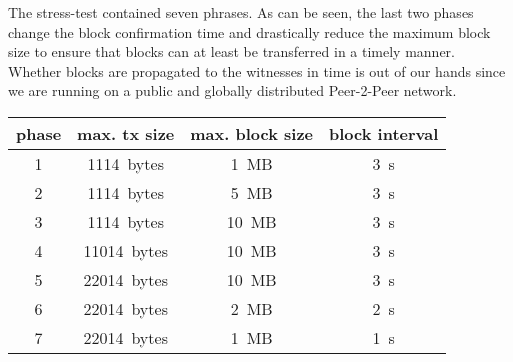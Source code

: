 The stress-test contained seven phrases. As can be seen, the last two phases
change the block confirmation time and drastically reduce the maximum block
size to ensure that blocks can at least be transferred in a timely manner.
Whether blocks are propagated to the witnesses in time is out of our hands
since we are running on a public and globally distributed Peer-2-Peer network.

\begin{tabular}{c|c|c|c}
 \textbf{phase} & \textbf{max. tx size} & \textbf{max. block size} & \textbf{block interval} \\\hline
 1 & \SI{1114}{bytes}  & \SI{1}{MB}  & \SI{3}{s} \\
 2 & \SI{1114}{bytes}  & \SI{5}{MB}  & \SI{3}{s} \\
 3 & \SI{1114}{bytes}  & \SI{10}{MB} & \SI{3}{s} \\
 4 & \SI{11014}{bytes} & \SI{10}{MB} & \SI{3}{s} \\
 5 & \SI{22014}{bytes} & \SI{10}{MB} & \SI{3}{s} \\
 6 & \SI{22014}{bytes} & \SI{2}{MB}  & \SI{2}{s} \\
 7 & \SI{22014}{bytes} & \SI{1}{MB}  & \SI{1}{s} \\\hline
\end{tabular}
